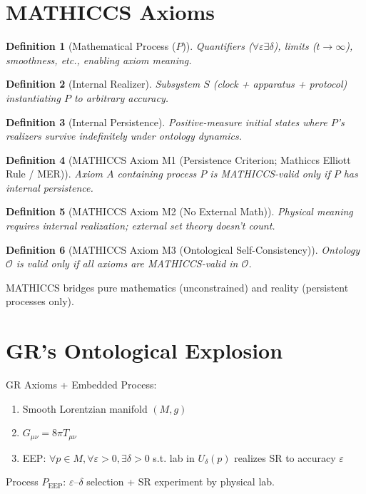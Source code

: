 \documentclass[11pt,a4paper]{article}
\newtheorem{definition}{Definition}
\begin{document}
\section{MATHICCS Axioms}
\begin{definition}[Mathematical Process ($P$)]
Quantifiers ($\forall\varepsilon\exists\delta$), limits ($t\to\infty$), smoothness, etc., enabling axiom meaning.
\end{definition}
\begin{definition}[Internal Realizer]
Subsystem $S$ (clock + apparatus + protocol) instantiating $P$ to arbitrary accuracy.
\end{definition}
\begin{definition}[Internal Persistence]
Positive-measure initial states where $P$'s realizers survive indefinitely under ontology dynamics.
\end{definition}
\begin{definition}[MATHICCS Axiom M1 (Persistence Criterion; Mathiccs Elliott Rule / MER)]
Axiom $A$ containing process $P$ is MATHICCS-valid only if $P$ has internal persistence.
\end{definition}
\begin{definition}[MATHICCS Axiom M2 (No External Math)]
Physical meaning requires internal realization; external set theory doesn't count.
\end{definition}
\begin{definition}[MATHICCS Axiom M3 (Ontological Self-Consistency)]
Ontology $\mathcal{O}$ is valid only if all axioms are MATHICCS-valid in $\mathcal{O}$.
\end{definition}
MATHICCS bridges pure mathematics (unconstrained) and reality (persistent processes only).

\section{GR's Ontological Explosion}
GR Axioms + Embedded Process:
\begin{enumerate}[label=G\arabic*.]
\item Smooth Lorentzian manifold $(M,g)$
\item $G_{\mu\nu}=8\pi T_{\mu\nu}$
\item EEP: $\forall p\in M,\forall\varepsilon>0,\exists\delta>0$ s.t. lab in $U_\delta(p)$ realizes SR to accuracy $\varepsilon$
\end{enumerate}
Process $P_{\text{EEP}}$: $\varepsilon$--$\delta$ selection + SR experiment by physical lab.
\end{document}
